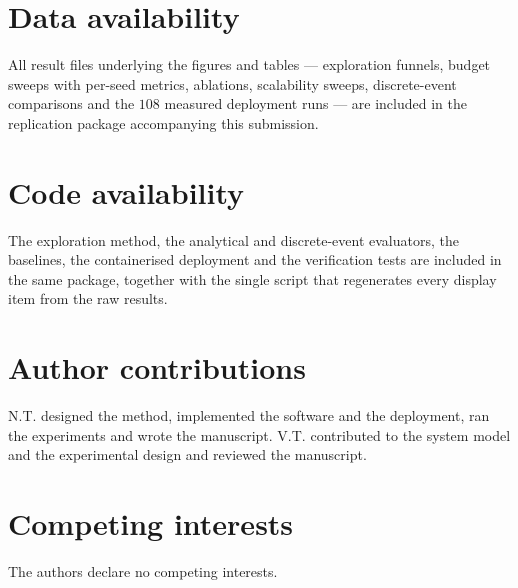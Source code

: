 \section*{Data availability}
All result files underlying the figures and tables --- exploration funnels, budget sweeps
with per-seed metrics, ablations, scalability sweeps, discrete-event comparisons and the
$108$ measured deployment runs --- are included in the replication package accompanying
this submission.

\section*{Code availability}
The exploration method, the analytical and discrete-event evaluators, the baselines, the
containerised deployment and the verification tests are included in the same package,
together with the single script that regenerates every display item from the raw results.

\section*{Author contributions}
N.T. designed the method, implemented the software and the deployment, ran the
experiments and wrote the manuscript. V.T. contributed to the system model and the
experimental design and reviewed the manuscript.

\section*{Competing interests}
The authors declare no competing interests.
